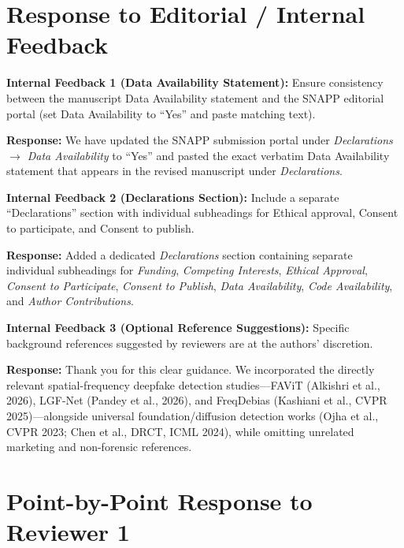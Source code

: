 \documentclass[11pt,a4paper]{article}
\newcommand{\reviewercomment}[2]{%
  \vspace{0.6em}\noindent\begin{tcolorbox}[colback=boxbg,colframe=revcolor,boxrule=0.6pt,left=6pt,right=6pt,top=4pt,bottom=4pt]
  \textbf{\color{revcolor}#1:} #2
  \end{tcolorbox}
}
\newcommand{\authorresponse}[1]{%
  \noindent\textbf{\color{respcolor}Response:} #1\par\vspace{0.5em}
}
\begin{document}
\section*{Response to Editorial / Internal Feedback}

\reviewercomment{Internal Feedback 1 (Data Availability Statement)}{Ensure consistency between the manuscript Data Availability statement and the SNAPP editorial portal (set Data Availability to ``Yes'' and paste matching text).}
\authorresponse{We have updated the SNAPP submission portal under \textit{Declarations $\to$ Data Availability} to ``Yes'' and pasted the exact verbatim Data Availability statement that appears in the revised manuscript under \textit{Declarations}.}

\reviewercomment{Internal Feedback 2 (Declarations Section)}{Include a separate ``Declarations'' section with individual subheadings for Ethical approval, Consent to participate, and Consent to publish.}
\authorresponse{Added a dedicated \textit{Declarations} section containing separate individual subheadings for \textit{Funding}, \textit{Competing Interests}, \textit{Ethical Approval}, \textit{Consent to Participate}, \textit{Consent to Publish}, \textit{Data Availability}, \textit{Code Availability}, and \textit{Author Contributions}.}

\reviewercomment{Internal Feedback 3 (Optional Reference Suggestions)}{Specific background references suggested by reviewers are at the authors' discretion.}
\authorresponse{Thank you for this clear guidance. We incorporated the directly relevant spatial-frequency deepfake detection studies---FAViT (Alkishri et al., 2026), LGF-Net (Pandey et al., 2026), and FreqDebias (Kashiani et al., CVPR 2025)---alongside universal foundation/diffusion detection works (Ojha et al., CVPR 2023; Chen et al., DRCT, ICML 2024), while omitting unrelated marketing and non-forensic references.}

\section*{Point-by-Point Response to Reviewer 1}
\end{document}
